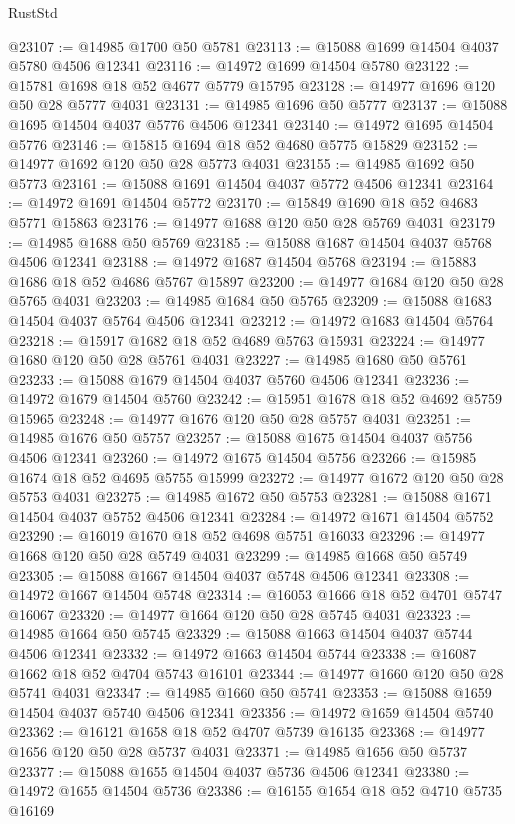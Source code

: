 \begin{lexlean}{RustStd}
\begin{coremodule}
@23107 := @14985 @1700 @50 @5781
@23113 := @15088 @1699 @14504 @4037 @5780 @4506 @12341
@23116 := @14972 @1699 @14504 @5780
@23122 := @15781 @1698 @18 @52 @4677 @5779 @15795
@23128 := @14977 @1696 @120 @50 @28 @5777 @4031
@23131 := @14985 @1696 @50 @5777
@23137 := @15088 @1695 @14504 @4037 @5776 @4506 @12341
@23140 := @14972 @1695 @14504 @5776
@23146 := @15815 @1694 @18 @52 @4680 @5775 @15829
@23152 := @14977 @1692 @120 @50 @28 @5773 @4031
@23155 := @14985 @1692 @50 @5773
@23161 := @15088 @1691 @14504 @4037 @5772 @4506 @12341
@23164 := @14972 @1691 @14504 @5772
@23170 := @15849 @1690 @18 @52 @4683 @5771 @15863
@23176 := @14977 @1688 @120 @50 @28 @5769 @4031
@23179 := @14985 @1688 @50 @5769
@23185 := @15088 @1687 @14504 @4037 @5768 @4506 @12341
@23188 := @14972 @1687 @14504 @5768
@23194 := @15883 @1686 @18 @52 @4686 @5767 @15897
@23200 := @14977 @1684 @120 @50 @28 @5765 @4031
@23203 := @14985 @1684 @50 @5765
@23209 := @15088 @1683 @14504 @4037 @5764 @4506 @12341
@23212 := @14972 @1683 @14504 @5764
@23218 := @15917 @1682 @18 @52 @4689 @5763 @15931
@23224 := @14977 @1680 @120 @50 @28 @5761 @4031
@23227 := @14985 @1680 @50 @5761
@23233 := @15088 @1679 @14504 @4037 @5760 @4506 @12341
@23236 := @14972 @1679 @14504 @5760
@23242 := @15951 @1678 @18 @52 @4692 @5759 @15965
@23248 := @14977 @1676 @120 @50 @28 @5757 @4031
@23251 := @14985 @1676 @50 @5757
@23257 := @15088 @1675 @14504 @4037 @5756 @4506 @12341
@23260 := @14972 @1675 @14504 @5756
@23266 := @15985 @1674 @18 @52 @4695 @5755 @15999
@23272 := @14977 @1672 @120 @50 @28 @5753 @4031
@23275 := @14985 @1672 @50 @5753
@23281 := @15088 @1671 @14504 @4037 @5752 @4506 @12341
@23284 := @14972 @1671 @14504 @5752
@23290 := @16019 @1670 @18 @52 @4698 @5751 @16033
@23296 := @14977 @1668 @120 @50 @28 @5749 @4031
@23299 := @14985 @1668 @50 @5749
@23305 := @15088 @1667 @14504 @4037 @5748 @4506 @12341
@23308 := @14972 @1667 @14504 @5748
@23314 := @16053 @1666 @18 @52 @4701 @5747 @16067
@23320 := @14977 @1664 @120 @50 @28 @5745 @4031
@23323 := @14985 @1664 @50 @5745
@23329 := @15088 @1663 @14504 @4037 @5744 @4506 @12341
@23332 := @14972 @1663 @14504 @5744
@23338 := @16087 @1662 @18 @52 @4704 @5743 @16101
@23344 := @14977 @1660 @120 @50 @28 @5741 @4031
@23347 := @14985 @1660 @50 @5741
@23353 := @15088 @1659 @14504 @4037 @5740 @4506 @12341
@23356 := @14972 @1659 @14504 @5740
@23362 := @16121 @1658 @18 @52 @4707 @5739 @16135
@23368 := @14977 @1656 @120 @50 @28 @5737 @4031
@23371 := @14985 @1656 @50 @5737
@23377 := @15088 @1655 @14504 @4037 @5736 @4506 @12341
@23380 := @14972 @1655 @14504 @5736
@23386 := @16155 @1654 @18 @52 @4710 @5735 @16169

\end{coremodule}
\end{lexlean}

